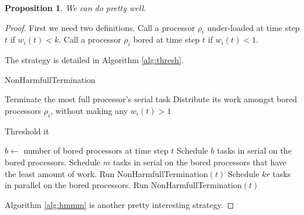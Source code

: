 \documentclass{article}[11pt]
\newtheorem{proposition}{Proposition}
\begin{document}
\begin{proposition}
  We can do pretty well.
\end{proposition}
\begin{proof}

  First we need two definitions. Call a processor $\rho_i$
  under-loaded at time step $t$ if $w_i(t) < k$. Call a processor
  $\rho_i$ bored at time step $t$ if $w_i(t) < 1$.

  The strategy is detailed in Algorithm \ref{alg:thresh}.

  \begin{algorithm}
    \caption{NonHarmfullTermination}
    \label{alg:nonharmfultermination}
    \begin{algorithmic}[1] 
            \State Terminate the most full processor's serial task
            \State Distribute its work amongst bored processors
            $\rho_i$, without making any $w_i(t) > 1$ 
          \EndWhile
      \EndProcedure
    \end{algorithmic}
  \end{algorithm}

  \begin{algorithm}
    \caption{Threshold it}
    \label{alg:thresh}
    \begin{algorithmic}[1] 
       
        \State $b\gets $ number of bored processors at time step
        $t$ 
            \State Schedule $b$ tasks in serial on the bored processors.
          \State Schedule $m$ tasks in serial on the
          bored processors that have the least amount of work. 
          \State Run NonHarmfullTermination$(t)$
            \State Schedule $kr$ tasks in parallel on the bored processors.
            \State Run NonHarmfullTermination$(t)$
        \EndIf
    \EndProcedure
    \end{algorithmic}
\end{algorithm}
Algorithm \ref{alg:hmmm} is another pretty interesting strategy.


\end{proof}
\end{document}
